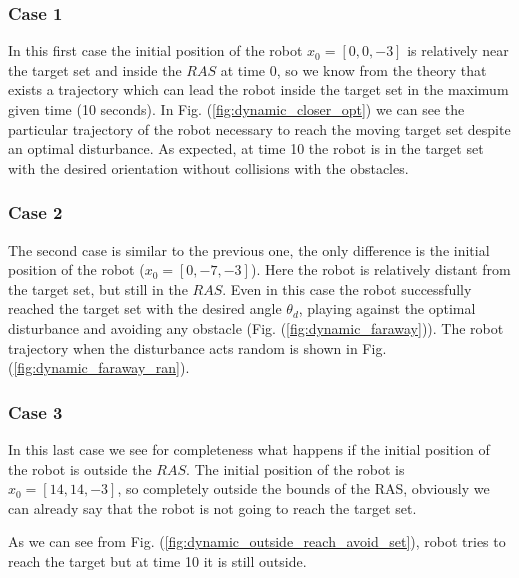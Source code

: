 \subsubsection{Case 1}
In this first case the initial position of the robot $x_0 = [0, 0, -3]$ is relatively near the target set and inside the $RAS$ at time 0, so we know from the theory that exists a trajectory which can lead the robot inside the target set in the maximum given time (10 seconds).
In Fig. (\ref{fig:dynamic_closer_opt}) we can see the particular trajectory of the robot necessary to reach the moving target set despite an optimal disturbance. As expected, at time 10 the robot is in the target set with the desired orientation without collisions with the obstacles.

\subsubsection{Case 2}
The second case is similar to the previous one, the only difference is the initial position of the robot ($x_0 = [0, -7, -3]$). Here the robot is relatively distant from the target set, but still in the $RAS$. Even in this case the robot successfully reached the target set with the desired angle $\theta_d$, playing against the optimal disturbance and avoiding any obstacle (Fig. (\ref{fig:dynamic_faraway})). The robot trajectory when the disturbance acts random is shown in Fig. (\ref{fig:dynamic_faraway_ran}).  

\subsubsection{Case 3}
In this last case we see for completeness what happens if the initial position of the robot is outside the $RAS$. The initial position of the robot is $x_0 = [14, 14, -3]$, so completely outside the bounds of the RAS, obviously we can already say that the robot is not going to reach the target set.

As we can see from Fig. (\ref{fig:dynamic_outside_reach_avoid_set}), robot tries to reach the target but at time 10 it is still outside.
        

